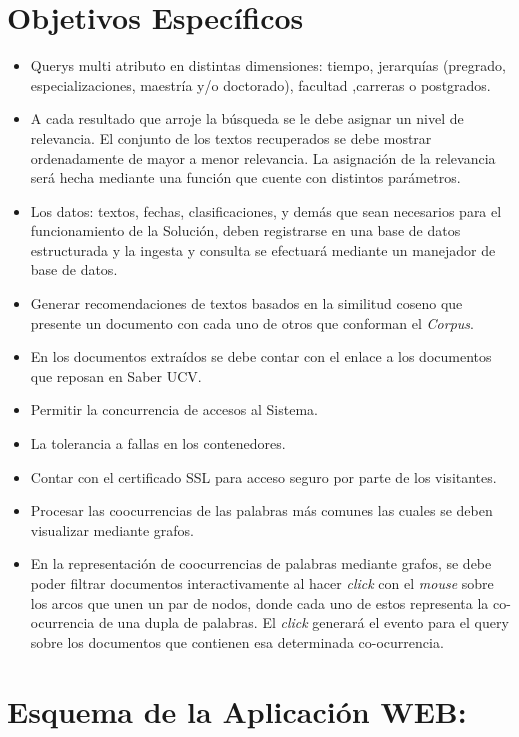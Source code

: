 \documentclass[
  10,
  openany]{book}
\begin{document}
\hypertarget{objetivosespe}{%
\section{Objetivos Específicos}\label{objetivosespe}}

\begin{itemize}
\item
  Querys multi atributo en distintas dimensiones: tiempo, jerarquías (pregrado, especializaciones, maestría y/o doctorado), facultad ,carreras o postgrados.
\item
  A cada resultado que arroje la búsqueda se le debe asignar un nivel de relevancia. El conjunto de los textos recuperados se debe mostrar ordenadamente de mayor a menor relevancia. La asignación de la relevancia será hecha mediante una función que cuente con distintos parámetros.
\item
  Los datos: textos, fechas, clasificaciones, y demás que sean necesarios para el funcionamiento de la Solución, deben registrarse en una base de datos estructurada y la ingesta y consulta se efectuará mediante un manejador de base de datos.
\item
  Generar recomendaciones de textos basados en la similitud coseno que presente un documento con cada uno de otros que conforman el \emph{Corpus}.
\item
  En los documentos extraídos se debe contar con el enlace a los documentos que reposan en Saber UCV.
\item
  Permitir la concurrencia de accesos al Sistema.
\item
  La tolerancia a fallas en los contenedores.
\item
  Contar con el certificado SSL para acceso seguro por parte de los visitantes.
\item
  Procesar las coocurrencias de las palabras más comunes las cuales se deben visualizar mediante grafos.
\item
  En la representación de coocurrencias de palabras mediante grafos, se debe poder filtrar documentos interactivamente al hacer \emph{click} con el \emph{mouse} sobre los arcos que unen un par de nodos, donde cada uno de estos representa la co-ocurrencia de una dupla de palabras. El \emph{click} generará el evento para el query sobre los documentos que contienen esa determinada co-ocurrencia.
\end{itemize}

\hypertarget{esquemas}{%
\section{Esquema de la Aplicación WEB:}\label{esquemas}}
\end{document}
